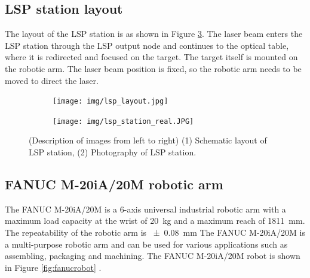 \subsection{LSP station layout}

The layout of the LSP station is as shown in Figure \ref{fig:lsplayout}. The laser
beam enters the LSP station through the LSP output node and
continues to the optical table, where it is redirected and
focused on the target. The target itself is mounted on the
robotic arm. The laser beam position is fixed, so the robotic
arm needs to be moved to direct the laser.

\begin{figure}[t!]
\centering
\begin{subfigure}{.45\textwidth}

    \texttt{[image: img/lsp\_layout.jpg]}

    \label{fig:a}
\end{subfigure}
\begin{subfigure}{.45\textwidth}

    \texttt{[image: img/lsp\_station\_real.JPG]}

    \label{fig:b}
\end{subfigure}

\caption{(Description of images from left to right) (1) Schematic layout of LSP station, (2) Photography of LSP station.}
\label{fig:lsplayout}
\end{figure}

\subsection{FANUC M-20iA/20M robotic arm}

The FANUC M-20iA/20M is a 6-axis universal industrial robotic arm with a maximum load capacity at the wrist of \SI{20}{\kg} and a maximum reach of \SI{1811}{\mm}. The repeatability of the robotic arm is \SI{+-0.08}{\mm} The FANUC M-20iA/20M is a multi-purpose robotic arm and can be used for various applications such as assembling, packaging and machining. The  FANUC M-20iA/20M robot is shown in Figure \ref{fig:fanucrobot} \cite{fanucrobot}.


